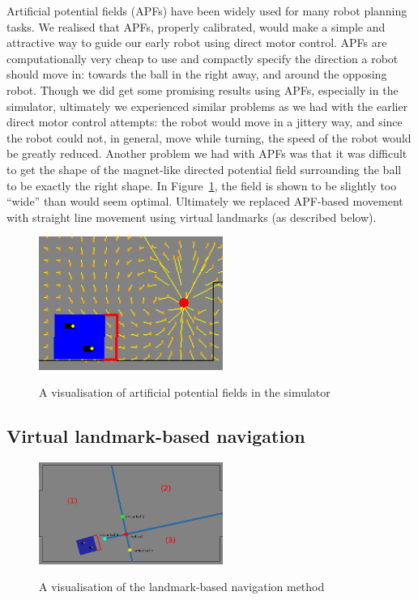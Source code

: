 \documentclass[12pt,a4paper,notitlepage,twocolumn]{report}
\begin{document}
Artificial potential fields (APFs) have been widely used for many
robot planning tasks. We realised that APFs, properly calibrated,
would make a simple and attractive way to guide our early robot using
direct motor control. APFs are computationally very cheap to use and
compactly specify the direction a robot should move in: towards the
ball in the right away, and around the opposing robot. Though we did
get some promising results using APFs, especially in the simulator,
ultimately we experienced similar problems as we had with the earlier
direct motor control attempts: the robot would move in a jittery way,
and since the robot could not, in general, move while turning, the
speed of the robot would be greatly reduced. Another problem we had
with APFs was that it was difficult to get the shape of the
magnet-like directed potential field surrounding the ball to be
exactly the right shape. In Figure~\ref{fig:apf}, the field is shown to be
slightly too “wide” than would seem optimal. Ultimately we replaced
APF-based movement with straight line movement using virtual landmarks
(as described below).

\begin{figure} [ht]
  \centering
  \includegraphics[width=60mm]{apf.png}
  \label{fig:apf}
  \caption{A visualisation of artificial potential fields in the simulator}
\end{figure}

\subsection*{Virtual landmark-based navigation}
\begin{figure} [ht]
  \centering
  \includegraphics[width=60mm]{vball.png}
  \label{fig:vball}
  \caption{A visualisation of the landmark-based navigation method}
\end{figure}
\end{document}
